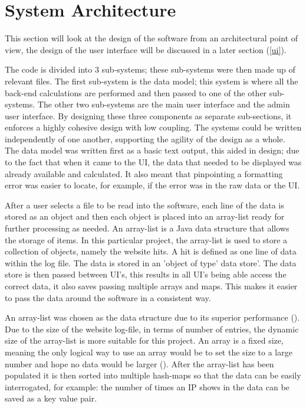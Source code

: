 \section{System Architecture}

This section will look at the design of the software from an architectural point of view, the design of the user interface will be discussed in a later section (\ref{ui}). 

The code is divided into 3 sub-systems; these sub-systems were then made up of relevant files. The first sub-system is the data model; this system is where all the back-end calculations are performed and then passed to one of the other sub-systems. The other two sub-systems are the main user interface and the admin user interface. By designing these three components as separate sub-sections, it enforces a highly cohesive design with low coupling. The systems could be written independently of one another, supporting the agility of the design as a whole. The data model was written first as a basic text output, this aided in design; due to the fact that when it came to the UI, the data that needed to be displayed was already available and calculated. It also meant that pinpointing a formatting error was easier to locate, for example, if the error was in the raw data or the UI. 

After a user selects a file to be read into the software, each line of the data is stored as an object and then each object is placed into an array-list ready for further processing as needed. An array-list is a Java data structure that allows the storage of items. In this particular project, the array-list is used to store a collection of objects, namely the website hits. A hit is defined as one line of data within the log file. The data is stored in an 'object of type' data store'. The data store is then passed between UI's, this results in all UI's being able access the correct data, it also saves passing multiple arrays and maps. This makes it easier to pass the data around the software in a consistent way.

An array-list was chosen as the data structure due to its superior performance (\cite{JavaAL}). Due to the size of the website log-file, in terms of number of entries, the dynamic size of the array-list is more suitable for this project. An array is a fixed size, meaning the only logical way to use an array would be to set the size to a large number and hope no data would be larger (\cite{Array}). After the array-list has been populated it is then sorted into multiple hash-maps so that the data can be easily interrogated, for example: the number of times an IP shows in the data can be saved as a key value pair. 


